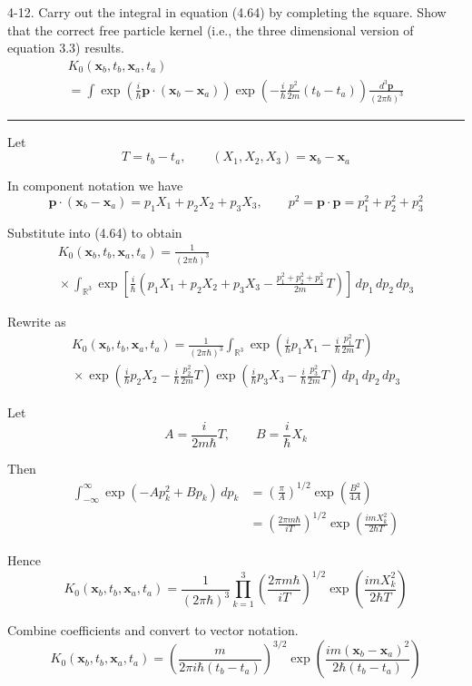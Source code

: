\documentclass[12pt]{article}
\newcommand\INT{\int_{\mathbb R^3}}
\begin{document}
4-12.
Carry out the integral in equation (4.64) by completing the square.
Show that the correct free particle kernel
(i.e., the three dimensional version of equation 3.3) results.
\begin{multline*}
K_0(\mathbf x_b,t_b,\mathbf x_a,t_a)
\\
=\int
\exp\left(\frac{i}{\hbar}\mathbf p\cdot(\mathbf x_b-\mathbf x_a)\right)
\exp\left(-\frac{i}{\hbar}\frac{p^2}{2m}(t_b-t_a)\right)
\frac{d^3\mathbf p}{(2\pi\hbar)^3}
\tag{4.64}
\end{multline*}

\bigskip
\hrule

\bigskip
Let
\begin{equation*}
T=t_b-t_a,
\qquad
(X_1,X_2,X_3)=\mathbf x_b-\mathbf x_a
\end{equation*}

In component notation we have
\begin{equation*}
\mathbf p\cdot(\mathbf x_b-\mathbf x_a)=p_1X_1+p_2X_2+p_3X_3,
\qquad
p^2=\mathbf p\cdot\mathbf p=p_1^2+p_2^2+p_3^2
\end{equation*}

Substitute into (4.64) to obtain
\begin{multline*}
K_0(\mathbf x_b,t_b,\mathbf x_a,t_a)=\frac{1}{(2\pi\hbar)^3}
\\
{}\times\INT
\exp\left[\frac{i}{\hbar}\left(
p_1X_1+p_2X_2+p_3X_3-\frac{p_1^2+p_2^2+p_3^2}{2m}\,T
\right)\right]
\,dp_1\,dp_2\,dp_3
\end{multline*}

Rewrite as
\begin{multline*}
K_0(\mathbf x_b,t_b,\mathbf x_a,t_a)=\frac{1}{(2\pi\hbar)^3}\INT
\exp\left(\frac{i}{\hbar}p_1X_1-\frac{i}{\hbar}\frac{p_1^2}{2m}T\right)
\\
{}\times
\exp\left(\frac{i}{\hbar}p_2X_2-\frac{i}{\hbar}\frac{p_2^2}{2m}T\right)
\exp\left(\frac{i}{\hbar}p_3X_3-\frac{i}{\hbar}\frac{p_3^2}{2m}T\right)
\,dp_1\,dp_2\,dp_3
\end{multline*}

Let
\begin{equation*}
A=\frac{i}{2m\hbar}T,
\qquad
B=\frac{i}{\hbar}X_k
\end{equation*}

Then
\begin{align*}
\int_{-\infty}^\infty\exp(-Ap_k^2+Bp_k)\,dp_k
&=\left(\frac{\pi}{A}\right)^{1/2}\exp\left(\frac{B^2}{4A}\right)
\\
&=\left(\frac{2\pi m\hbar}{iT}\right)^{1/2}
\exp\left(\frac{imX_k^2}{2\hbar T}\right)
\tag{1}
\end{align*}

Hence
\begin{equation*}
K_0(\mathbf x_b,t_b,\mathbf x_a,t_a)=
\frac{1}{(2\pi\hbar)^3}
\prod_{k=1}^3
\left(\frac{2\pi m\hbar}{iT}\right)^{1/2}
\exp\left(\frac{imX_k^2}{2\hbar T}\right)
\end{equation*}

Combine coefficients and convert to vector notation.
\begin{equation*}
K_0(\mathbf x_b,t_b,\mathbf x_a,t_a)=
\left(\frac{m}{2\pi i\hbar(t_b-t_a)}\right)^{3/2}
\exp\left(\frac{im(\mathbf x_b-\mathbf x_a)^2}{2\hbar(t_b-t_a)}\right)
\tag{2}
\end{equation*}
\end{document}
